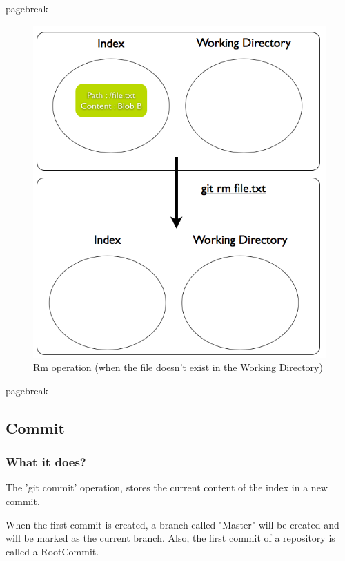 pagebreak
\pagebreak 

\begin{figure}[h] 
	\caption{Rm operation (when the file doesn't exist in the Working
	Directory)}
	\centering
	\includegraphics[scale=0.40]{images/rm2.png}
\end{figure}

pagebreak
\pagebreak 


\subsection{Commit}

\subsubsection{What it does?}

The 'git commit' operation, stores the current content of the index in a new
commit. \par
When the first commit is created, a branch called "Master" will be created
and will be marked as the current branch. Also, the first commit of a repository
is called a RootCommit. \par

